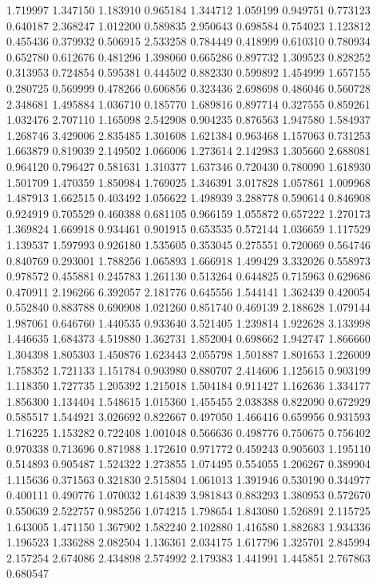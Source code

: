 1.719997
1.347150
1.183910
0.965184
1.344712
1.059199
0.949751
0.773123
0.640187
2.368247
1.012200
0.589835
2.950643
0.698584
0.754023
1.123812
0.455436
0.379932
0.506915
2.533258
0.784449
0.418999
0.610310
0.780934
0.652780
0.612676
0.481296
1.398060
0.665286
0.897732
1.309523
0.828252
0.313953
0.724854
0.595381
0.444502
0.882330
0.599892
1.454999
1.657155
0.280725
0.569999
0.478266
0.606856
0.323436
2.698698
0.486046
0.560728
2.348681
1.495884
1.036710
0.185770
1.689816
0.897714
0.327555
0.859261
1.032476
2.707110
1.165098
2.542908
0.904235
0.876563
1.947580
1.584937
1.268746
3.429006
2.835485
1.301608
1.621384
0.963468
1.157063
0.731253
1.663879
0.819039
2.149502
1.066006
1.273614
2.142983
1.305660
2.688081
0.964120
0.796427
0.581631
1.310377
1.637346
0.720430
0.780090
1.618930
1.501709
1.470359
1.850984
1.769025
1.346391
3.017828
1.057861
1.009968
1.487913
1.662515
0.403492
1.056622
1.498939
3.288778
0.590614
0.846908
0.924919
0.705529
0.460388
0.681105
0.966159
1.055872
0.657222
1.270173
1.369824
1.669918
0.934461
0.901915
0.653535
0.572144
1.036659
1.117529
1.139537
1.597993
0.926180
1.535605
0.353045
0.275551
0.720069
0.564746
0.840769
0.293001
1.788256
1.065893
1.666918
1.499429
3.332026
0.558973
0.978572
0.455881
0.245783
1.261130
0.513264
0.644825
0.715963
0.629686
0.470911
2.196266
6.392057
2.181776
0.645556
1.544141
1.362439
0.420054
0.552840
0.883788
0.690908
1.021260
0.851740
0.469139
2.188628
1.079144
1.987061
0.646760
1.440535
0.933640
3.521405
1.239814
1.922628
3.133998
1.446635
1.684373
4.519880
1.362731
1.852004
0.698662
1.942747
1.866660
1.304398
1.805303
1.450876
1.623443
2.055798
1.501887
1.801653
1.226009
1.758352
1.721133
1.151784
0.903980
0.880707
2.414606
1.125615
0.903199
1.118350
1.727735
1.205392
1.215018
1.504184
0.911427
1.162636
1.334177
1.856300
1.134404
1.548615
1.015360
1.455455
2.038388
0.822090
0.672929
0.585517
1.544921
3.026692
0.822667
0.497050
1.466416
0.659956
0.931593
1.716225
1.153282
0.722408
1.001048
0.566636
0.498776
0.750675
0.756402
0.970338
0.713696
0.871988
1.172610
0.971772
0.459243
0.905603
1.195110
0.514893
0.905487
1.524322
1.273855
1.074495
0.554055
1.206267
0.389904
1.115636
0.371563
0.321830
2.515804
1.061013
1.391946
0.530190
0.344977
0.400111
0.490776
1.070032
1.614839
3.981843
0.883293
1.380953
0.572670
0.550639
2.522757
0.985256
1.074215
1.798654
1.843080
1.526891
2.115725
1.643005
1.471150
1.367902
1.582240
2.102880
1.416580
1.882683
1.934336
1.196523
1.336288
2.082504
1.136361
2.034175
1.617796
1.325701
2.845994
2.157254
2.674086
2.434898
2.574992
2.179383
1.441991
1.445851
2.767863
0.680547
